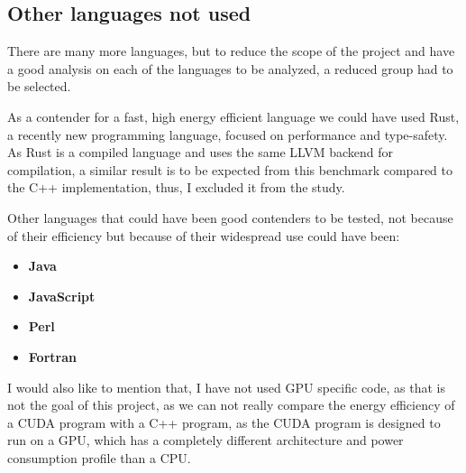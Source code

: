 \subsection{Other languages not used}

There are many more languages, but to reduce the scope of the project and have a good analysis on each of the languages to be analyzed, a reduced group had to be selected. 

As a contender for a fast, high energy efficient language we could have used Rust, a recently new programming language, focused on performance and type-safety. As Rust is a compiled language and uses the same \gls{LLVM} backend for compilation, a similar result is to be expected from this benchmark compared to the C++ implementation, thus, I excluded it from the study.

Other languages that could have been good contenders to be tested, not because of their efficiency but because of their widespread use could have been:
\begin{itemize}
	\item \textbf{Java}
	\item \textbf{JavaScript}
	\item \textbf{Perl}
	\item \textbf{Fortran}
\end{itemize}

I would also like to mention that, I have not used GPU specific code, as that is not the goal of this project, as we can not really compare the energy efficiency of a CUDA program with a C++ program, as the CUDA program is designed to run on a GPU, which has a completely different architecture and power consumption profile than a CPU.

